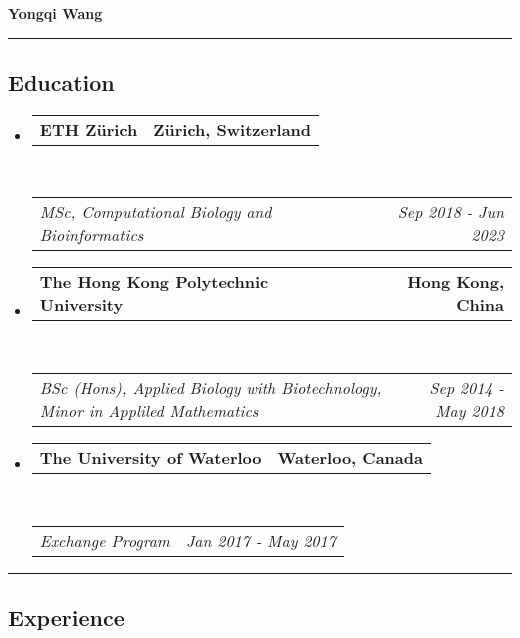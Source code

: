 \documentclass[10pt,letterpaper]{article}
\makeatletter
\newcommand{\headerrow}[2]
{\begin{tabular*}{\linewidth}{l@{\extracolsep{\fill}}r}
	#1 &
	#2 \\
\end{tabular*}}
\makeatother
\begin{document}

\begin{center}
{\LARGE \textbf{Yongqi Wang}}

\end{center}



\hrule
\vspace{-1em}
\subsection*{Education}

\begin{itemize}
	\parskip=0.1em

	\item
	\headerrow
		{\textbf{ETH Zürich}}
		{\textbf{Zürich, Switzerland}}
	\\
	\headerrow
		{\emph{MSc, Computational Biology and Bioinformatics}}
		{\emph{Sep 2018 - Jun 2023}}

	\item
	\headerrow
		{\textbf{The Hong Kong Polytechnic University}}
		{\textbf{Hong Kong, China}}
	\\
	\headerrow
		{\emph{BSc (Hons), Applied Biology with Biotechnology, Minor in Appliled Mathematics}}
		{\emph{Sep 2014 - May 2018}}

	\item
	\headerrow
		{\textbf{The University of Waterloo}}
		{\textbf{Waterloo, Canada}}
	\\
	\headerrow
		{\emph{Exchange Program}}
		{\emph{Jan 2017 - May 2017}}

\end{itemize}



\hrule
\vspace{-1em}
\subsection*{Experience}
\end{document}
